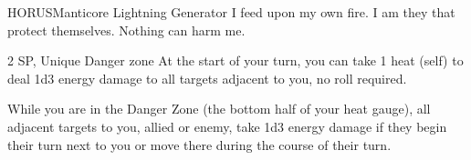 \begin{mech}{HORUS}{Manticore}
Lightning Generator
I feed upon my own fire. I am they that protect themselves. Nothing can harm me.

2 SP, Unique
Danger zone
At the start of your turn, you can take 1 heat (self) to deal 1d3 energy damage to all targets adjacent to you, no roll required.

While you are in the Danger Zone (the bottom half of your heat gauge), all adjacent targets to you, allied or enemy, take 1d3 energy damage if they begin their turn next to you or move there during the course of their turn.


\end{mech}
